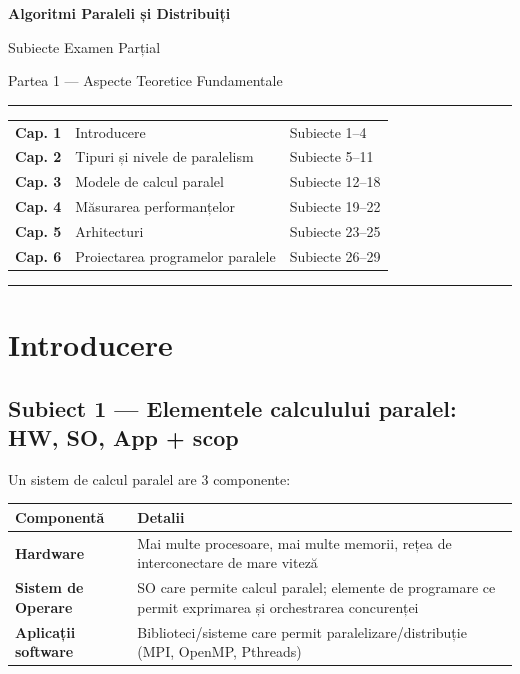 \documentclass[a4paper,11pt]{article}
\newcommand{\thead}[1]{\cellcolor{tblh}\color{white}\textbf{#1}}
\newcommand{\subiect}[2]{\subsection{Subiect \textcolor{numcol}{#1} — #2}}
\begin{document}
\begin{titlepage}
  \centering
  \vspace*{2cm}
  {\Huge\bfseries\color{primary}Algoritmi Paraleli și Distribuiți\par}
  \vspace{0.6cm}
  {\Large\color{darkgray}Subiecte Examen Parțial\par}
  \vspace{0.3cm}
  {\large\color{darkgray}Partea 1 — Aspecte Teoretice Fundamentale\par}
  \vspace{1.5cm}
  \hrule\vspace{0.4cm}
  \begin{tabular}{rll}
    \textbf{Cap. 1} & Introducere & Subiecte 1–4 \\
    \textbf{Cap. 2} & Tipuri și nivele de paralelism & Subiecte 5–11 \\
    \textbf{Cap. 3} & Modele de calcul paralel & Subiecte 12–18 \\
    \textbf{Cap. 4} & Măsurarea performanțelor & Subiecte 19–22 \\
    \textbf{Cap. 5} & Arhitecturi & Subiecte 23–25 \\
    \textbf{Cap. 6} & Proiectarea programelor paralele & Subiecte 26–29 \\
  \end{tabular}
  \vspace{0.4cm}\hrule
  \vfill
\end{titlepage}

\tableofcontents\newpage

\section{Introducere}

\subiect{1}{Elementele calculului paralel: HW, SO, App + scop}

Un sistem de calcul paralel are 3 componente:

\begin{center}
\begin{tabularx}{\textwidth}{lX}
\toprule
\thead{Componentă} & \thead{Detalii} \\
\midrule
\textbf{Hardware} & Mai multe procesoare, mai multe memorii, rețea de interconectare de mare viteză \\
\textbf{Sistem de Operare} & SO care permite calcul paralel; elemente de programare ce permit exprimarea și orchestrarea concurenței \\
\textbf{Aplicații software} & Biblioteci/sisteme care permit paralelizare/distribuție (MPI, OpenMP, Pthreads) \\
\bottomrule
\end{tabularx}
\end{center}
\end{document}

